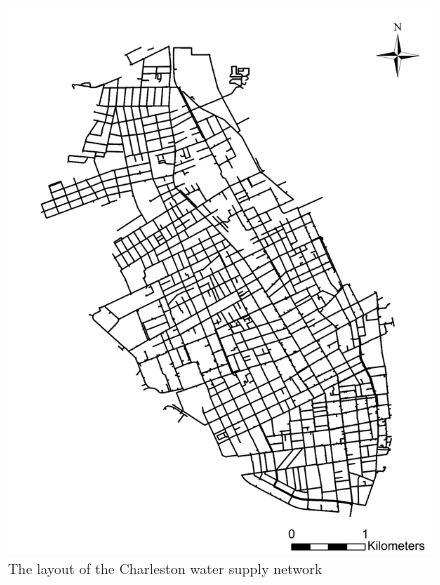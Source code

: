     \begin{figure}[H]
        \centering
        \includegraphics[scale=0.5]{Figures/Images/Reliability Analysis of Water Supply Network/CWSN.png}
        \caption{The layout of the Charleston water supply network}
        \label{fig:CWSN}
    \end{figure}
